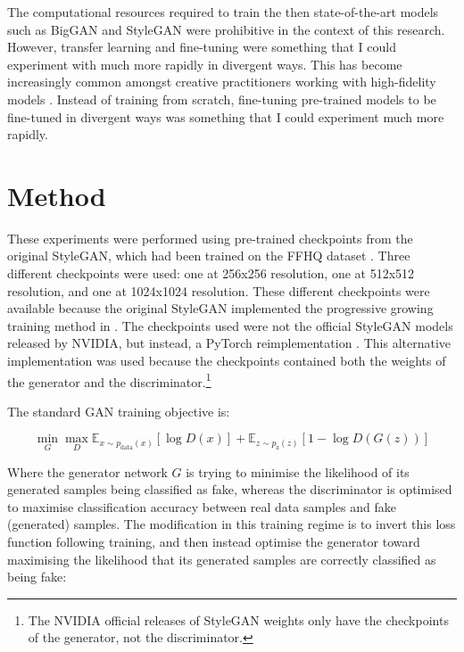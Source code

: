 The computational resources required to train the then state-of-the-art models such as BigGAN \citep{brock2018large} and StyleGAN \citep{karras2019style} were prohibitive in the context of this research. 
However, transfer learning and fine-tuning were something that I could experiment with much more rapidly in divergent ways. 
This has become increasingly common amongst creative practitioners working with high-fidelity models \citep{berns2020bridging}. 
Instead of training from scratch, fine-tuning pre-trained models to be fine-tuned in divergent ways was something that I could experiment much more rapidly. 

\section{Method}
\label{c4:sec:method}

These experiments were performed using pre-trained checkpoints from the original StyleGAN, which had been trained on the FFHQ dataset \citep{karras2019style}. 
Three different checkpoints were used: one at 256x256 resolution, one at 512x512 resolution, and one at 1024x1024 resolution. 
These different checkpoints were available because the original StyleGAN implemented the progressive growing training method in \citep{karras2017progressive}.
The checkpoints used were not the official StyleGAN models released by NVIDIA, but instead, a PyTorch reimplementation \citep{rosinality2019style}.
This alternative implementation was used because the checkpoints contained both the weights of the generator and the discriminator.\footnote{The NVIDIA official releases of StyleGAN weights only have the checkpoints of the generator, not the discriminator.}

The standard GAN training objective is:

\begin{equation} 
\min_{G}\max_{D}\mathbb{E}_{x\sim p_{\text{data}}(x)}[\log{D(x)}] +  \mathbb{E}_{z\sim p_{\text{z}}(z)}[1 - \log{D(G(z))}]
\end{equation}

Where the generator network $G$ is trying to minimise the likelihood of its generated samples being classified as fake, whereas the discriminator is optimised to maximise classification accuracy between real data samples and fake (generated) samples.
The modification in this training regime is to invert this loss function following training, and then instead optimise the generator toward maximising the likelihood that its generated samples are correctly classified as being fake:

